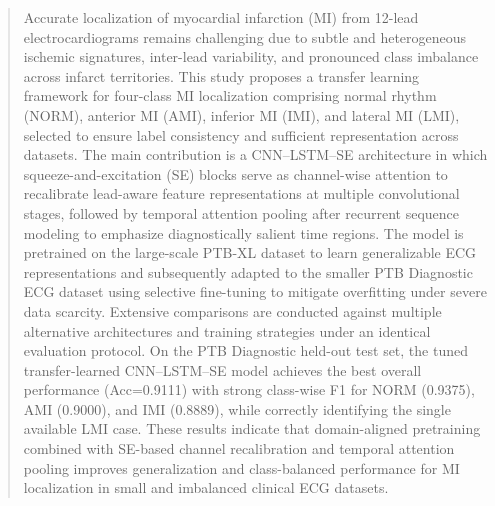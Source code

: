 \documentclass[preprint,12pt]{elsarticle}
\begin{document}
\begin{frontmatter}






            

\begin{abstract}
Accurate localization of myocardial infarction (MI) from 12-lead electrocardiograms remains challenging due to subtle and heterogeneous ischemic signatures, inter-lead variability, and pronounced class imbalance across infarct territories. This study proposes a transfer learning framework for four-class MI localization comprising normal rhythm (NORM), anterior MI (AMI), inferior MI (IMI), and lateral MI (LMI), selected to ensure label consistency and sufficient representation across datasets. The main contribution is a CNN--LSTM--SE architecture in which squeeze-and-excitation (SE) blocks serve as channel-wise attention to recalibrate lead-aware feature representations at multiple convolutional stages, followed by temporal attention pooling after recurrent sequence modeling to emphasize diagnostically salient time regions. The model is pretrained on the large-scale PTB-XL dataset to learn generalizable ECG representations and subsequently adapted to the smaller PTB Diagnostic ECG dataset using selective fine-tuning to mitigate overfitting under severe data scarcity. Extensive comparisons are conducted against multiple alternative architectures and training strategies under an identical evaluation protocol. On the PTB Diagnostic held-out test set, the tuned transfer-learned CNN--LSTM--SE model achieves the best overall performance (Acc=0.9111) with strong class-wise F1 for NORM (0.9375), AMI (0.9000), and IMI (0.8889), while correctly identifying the single available LMI case. These results indicate that domain-aligned pretraining combined with SE-based channel recalibration and temporal attention pooling improves generalization and class-balanced performance for MI localization in small and imbalanced clinical ECG datasets.
\end{abstract}



\end{frontmatter}
\end{document}
